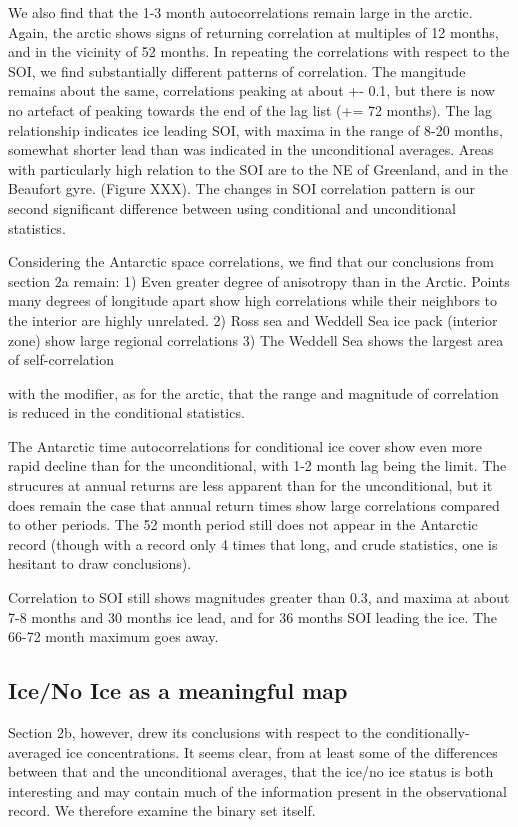 We also find that the 1-3 month autocorrelations remain large in the arctic.
Again, the arctic shows signs of returning correlation at multiples of
12 months, and in the vicinity of 52 months.  In repeating the correlations
with respect to the SOI, we find substantially different patterns of
correlation.  The mangitude remains about the same, correlations peaking
at about +- 0.1, but there is now no artefact of peaking towards the end
of the lag list (+= 72 months).  The lag relationship indicates ice leading
SOI, with maxima in the range of 8-20 months, somewhat shorter lead than
was indicated in the unconditional averages.  Areas with particularly high
relation to the SOI are to the NE of Greenland, and in the Beaufort gyre.
(Figure XXX).  The changes in SOI correlation pattern is our second significant
difference between using conditional and unconditional statistics.

  Considering the Antarctic space correlations, we find that our
conclusions from section 2a remain:
  1) Even greater degree of anisotropy than in the Arctic.  Points many degrees
of longitude apart show high correlations while their neighbors to the
interior are highly unrelated.
  2) Ross sea and Weddell Sea ice pack (interior zone) show large regional
correlations
  3) The Weddell Sea shows the largest area of self-correlation

with the modifier, as for the arctic, that the range and magnitude of 
correlation is reduced in the conditional statistics.

  The Antarctic time autocorrelations for conditional ice cover show
even more rapid decline than for the unconditional, with 1-2 month lag
being the limit.  The strucures at annual returns are less apparent than
for the unconditional, but it does remain the case that annual return times
show large correlations compared to other periods.  The 52 month period still
does not appear in the Antarctic record (though with a record only 4 times
that long, and crude statistics, one is hesitant to draw conclusions).

  Correlation to SOI still shows magnitudes greater than 0.3, and maxima
at about 7-8 months and 30 months ice lead, and for 36 months SOI leading
the ice.  The 66-72 month maximum goes away.

\subsection{Ice/No Ice as a meaningful map}
  Section 2b, however, drew its conclusions with respect to the conditionally-
averaged ice concentrations.  It seems clear, from at least some of the 
differences between that and the unconditional averages, that the ice/no 
ice status is both interesting and may contain much of the information 
present in the observational record.  We therefore examine the binary set
itself.   

